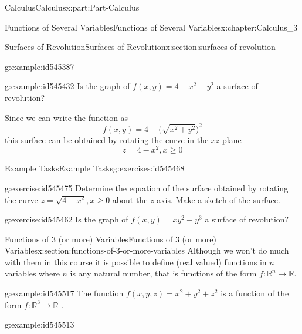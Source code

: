 \documentclass[oneside,10pt,]{book}
\numberwithin{equation}{section}
\begin{document}
\begin{partptx}{Calculus}{}{Calculus}{}{}{x:part:Part-Calculus}
\begin{chapterptx}{Functions of Several Variables}{}{Functions of Several Variables}{}{}{x:chapter:Calculus_3}
\begin{sectionptx}{Surfaces of Revolution}{}{Surfaces of Revolution}{}{}{x:section:surfaces-of-revolution}
\begin{example}{}{g:example:id545387}
%
\end{example}
\begin{example}{}{g:example:id545432}%
Is the graph of \(f(x,y)=4-x^2-y^2\) a surface of revolution?%
\par\smallskip%
\noindent\hypertarget{g:solution:id545424}{}Since we can write the function as%
\begin{equation*}
f(x,y)=4-\big(\sqrt{x^2+y^2}\big)^2
\end{equation*}
this surface can be obtained by rotating the curve in the \(xz\)-plane%
\begin{equation*}
z=4-x^2, x\geq 0
\end{equation*}
%
\end{example}
%
%
\typeout{************************************************}
\typeout{************************************************}
%
\begin{exercises-subsection-numberless}{Example Tasks}{}{Example Tasks}{}{}{g:exercises:id545468}
\begin{divisionexercise}{1}{}{}{g:exercise:id545475}%
Determine the equation of the surface obtained by rotating the curve \(z=\sqrt{4-x^2}, x\geq 0\) about the \(z\)-axis. Make a sketch of the surface.%
\end{divisionexercise}%
\begin{divisionexercise}{2}{}{}{g:exercise:id545462}%
Is the graph of \(f(x,y)=xy^2-y^3\) a surface of revolution?%
\end{divisionexercise}%
\end{exercises-subsection-numberless}
\end{sectionptx}
%
%
\typeout{************************************************}
\typeout{************************************************}
%
\begin{sectionptx}{Functions of 3 (or more) Variables}{}{Functions of 3 (or more) Variables}{}{}{x:section:functions-of-3-or-more-variables}
Although we won’t do much with them in this course it is possible to define (real valued) functions in \(n\) variables where \(n\) is any natural number, that is functions of the form \(f:\mathbb{R}^n\rightarrow\mathbb{R}\).%
\begin{example}{}{g:example:id545517}%
The function \(f(x,y,z)=x^2+y^2+z^2\) is a function of the form \(f:\mathbb{R}^3\rightarrow\mathbb{R}\) .%
\end{example}
\begin{example}{}{g:example:id545513}%

\end{example}
\end{sectionptx}
\end{chapterptx}
\end{partptx}
\end{document}
